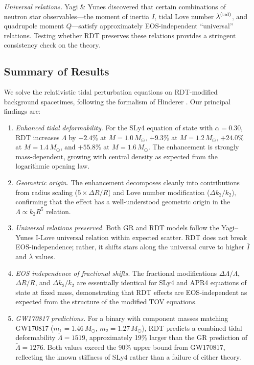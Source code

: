\documentclass[twocolumn,showpacs,preprintnumbers,amsmath,amssymb,prd]{revtex4-2}
\begin{document}
\textit{Universal relations.} Yagi \& Yunes \cite{Yagi2013,Yagi2017} discovered that certain combinations of neutron star observables---the moment of inertia $I$, tidal Love number $\lambda^{(\rm tid)}$, and quadrupole moment $Q$---satisfy approximately EOS-independent ``universal'' relations. Testing whether RDT preserves these relations provides a stringent consistency check on the theory.

\subsection{Summary of Results}
\label{sec:intro_summary}

We solve the relativistic tidal perturbation equations on RDT-modified background spacetimes, following the formalism of Hinderer \cite{Hinderer2008}. Our principal findings are:

\begin{enumerate}
\item \textit{Enhanced tidal deformability.} For the SLy4 equation of state with $\alpha = 0.30$, RDT increases $\Lambda$ by $+2.4\%$ at $M = 1.0\,M_\odot$, $+9.3\%$ at $M = 1.2\,M_\odot$, $+24.0\%$ at $M = 1.4\,M_\odot$, and $+55.8\%$ at $M = 1.6\,M_\odot$. The enhancement is strongly mass-dependent, growing with central density as expected from the logarithmic opening law.

\item \textit{Geometric origin.} The enhancement decomposes cleanly into contributions from radius scaling ($5 \times \Delta R/R$) and Love number modification ($\Delta k_2/k_2$), confirming that the effect has a well-understood geometric origin in the $\Lambda \propto k_2 R^5$ relation.

\item \textit{Universal relations preserved.} Both GR and RDT models follow the Yagi--Yunes I-Love universal relation within expected scatter. RDT does not break EOS-independence; rather, it shifts stars along the universal curve to higher $\bar{I}$ and $\bar{\lambda}$ values.

\item \textit{EOS independence of fractional shifts.} The fractional modifications $\Delta\Lambda/\Lambda$, $\Delta R/R$, and $\Delta k_2/k_2$ are essentially identical for SLy4 and APR4 equations of state at fixed mass, demonstrating that RDT effects are EOS-independent as expected from the structure of the modified TOV equations.

\item \textit{GW170817 predictions.} For a binary with component masses matching GW170817 ($m_1 = 1.46\,M_\odot$, $m_2 = 1.27\,M_\odot$), RDT predicts a combined tidal deformability $\tilde{\Lambda} = 1519$, approximately 19\% larger than the GR prediction of $\tilde{\Lambda} = 1276$. Both values exceed the 90\% upper bound from GW170817, reflecting the known stiffness of SLy4 rather than a failure of either theory.
\end{enumerate}
\end{document}
